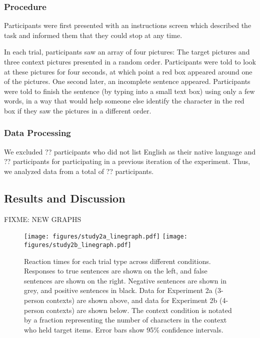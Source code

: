\documentclass[man]{apa2}
\begin{document}
\subsubsection{Procedure}

Participants were first presented with an instructions screen which described the task and informed them that they could stop at any time.  

In each trial, participants saw an array of four pictures: The target pictures and three context pictures presented in a random order.  Participants were told to look at these pictures for four seconds, at which point a red box appeared around one of the pictures.  One second later, an incomplete sentence appeared.  Participants were told to finish the sentence (by typing into a small text box) using only a few words, in a way that would help someone else identify the character in the red box if they saw the pictures in a different order.  
 
 \subsubsection{Data Processing}
We excluded ?? participants who did not list English as their native language and ?? participants for participating in a previous iteration of the experiment.  Thus, we analyzed data from a total of ?? participants.  

\subsection{Results and Discussion}


FIXME: NEW GRAPHS
\begin{figure}[t]
\begin{center} 
\texttt{[image: figures/study2a\_linegraph.pdf]}
\texttt{[image: figures/study2b\_linegraph.pdf]}
\caption{\label{fig:e2line} Reaction times for each trial type across different conditions. Responses to true sentences are shown on the left, and false sentences are shown on the right.  Negative sentences are shown in grey, and positive sentences in black.  Data for Experiment 2a (3-person contexts) are shown above, and data for Experiment 2b (4-person contexts) are shown below.  The context condition is notated by a fraction representing the number of characters in the context who held target items. Error bars show 95\% confidence intervals.  }
\end{center} 
\end{figure}
\end{document}
